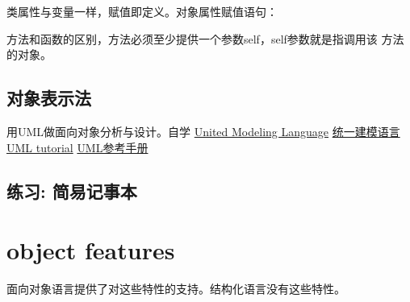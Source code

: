 类属性与变量一样，赋值即定义。对象属性赋值语句：


方法和函数的区别，方法必须至少提供一个参数self，self参数就是指调用该
  方法的对象。



\subsection{对象表示法}
用UML做面向对象分析与设计。自学
\href{https://en.wikipedia.org/wiki/Unified_Modeling_Language}{United Modeling Language}
\href{http://www.uml.org/what-is-uml.htm}{统一建模语言}
\href{https://www.w3cschool.cn/uml_tutorial}{UML tutorial}
\href{file:./misc/UML_Tutorial.pdf}{UML参考手册}

\subsection{练习: 简易记事本}



\section{object features}
面向对象语言提供了对这些特性的支持。结构化语言没有这些特性。
